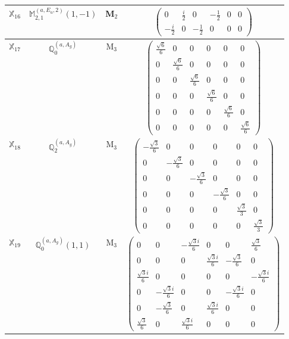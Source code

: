 \documentclass[fleqn,10pt,landscape]{article}
\begin{document}
\begin{itemize}
\begin{center}
\begin{longtable}{c|c|c|c}
$ \mathbb{X}_{16} $ & $\mathbb{M}_{2,1}^{(a,E_{u},2)}(1,-1)$ & M$_{2}$ & $\begin{pmatrix} 0 & \frac{i}{2} & 0 & - \frac{1}{2} & 0 & 0 \\ - \frac{i}{2} & 0 & - \frac{1}{2} & 0 & 0 & 0 \end{pmatrix}$ \\ \hline
$ \mathbb{X}_{17} $ & $\mathbb{Q}_{0}^{(a,A_{g})}$ & M$_{3}$ & $\begin{pmatrix} \frac{\sqrt{6}}{6} & 0 & 0 & 0 & 0 & 0 \\ 0 & \frac{\sqrt{6}}{6} & 0 & 0 & 0 & 0 \\ 0 & 0 & \frac{\sqrt{6}}{6} & 0 & 0 & 0 \\ 0 & 0 & 0 & \frac{\sqrt{6}}{6} & 0 & 0 \\ 0 & 0 & 0 & 0 & \frac{\sqrt{6}}{6} & 0 \\ 0 & 0 & 0 & 0 & 0 & \frac{\sqrt{6}}{6} \end{pmatrix}$ \\
$ \mathbb{X}_{18} $ & $\mathbb{Q}_{2}^{(a,A_{g})}$ & M$_{3}$ & $\begin{pmatrix} - \frac{\sqrt{3}}{6} & 0 & 0 & 0 & 0 & 0 \\ 0 & - \frac{\sqrt{3}}{6} & 0 & 0 & 0 & 0 \\ 0 & 0 & - \frac{\sqrt{3}}{6} & 0 & 0 & 0 \\ 0 & 0 & 0 & - \frac{\sqrt{3}}{6} & 0 & 0 \\ 0 & 0 & 0 & 0 & \frac{\sqrt{3}}{3} & 0 \\ 0 & 0 & 0 & 0 & 0 & \frac{\sqrt{3}}{3} \end{pmatrix}$ \\
$ \mathbb{X}_{19} $ & $\mathbb{Q}_{0}^{(a,A_{g})}(1,1)$ & M$_{3}$ & $\begin{pmatrix} 0 & 0 & - \frac{\sqrt{3} i}{6} & 0 & 0 & \frac{\sqrt{3}}{6} \\ 0 & 0 & 0 & \frac{\sqrt{3} i}{6} & - \frac{\sqrt{3}}{6} & 0 \\ \frac{\sqrt{3} i}{6} & 0 & 0 & 0 & 0 & - \frac{\sqrt{3} i}{6} \\ 0 & - \frac{\sqrt{3} i}{6} & 0 & 0 & - \frac{\sqrt{3} i}{6} & 0 \\ 0 & - \frac{\sqrt{3}}{6} & 0 & \frac{\sqrt{3} i}{6} & 0 & 0 \\ \frac{\sqrt{3}}{6} & 0 & \frac{\sqrt{3} i}{6} & 0 & 0 & 0 \end{pmatrix}$ \\

\end{longtable}
\end{center}
\end{itemize}
\end{document}
